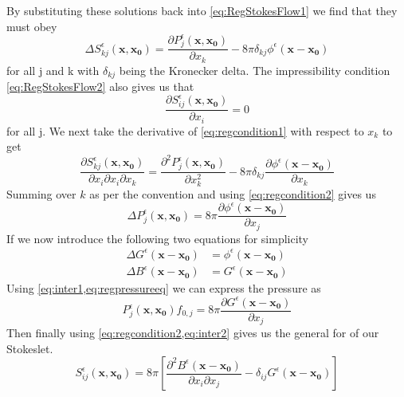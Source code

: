 By substituting these solutions back into \cref{eq:RegStokesFlow1} we find that they must obey
\begin{equation}
\label{eq:regcondition1}
    \Delta S^\epsilon_{kj}(\mathbf{x},\mathbf{x_0}) = \frac{\partial P^\epsilon_{j}(\mathbf{x},\mathbf{x_0})}{\partial x_k} - 8\pi\delta_{kj}\phi^\epsilon(\mathbf{x}-\mathbf{x_0})
\end{equation}
for all j and k with $\delta_{kj}$ being the Kronecker delta. The impressibility condition \cref{eq:RegStokesFlow2} also gives us that
\begin{equation}
\label{eq:regcondition2}
    \frac{\partial S^\epsilon_{ij}(\mathbf{x},\mathbf{x_0})}{\partial x_i} = 0
\end{equation}
for all j. We next take the derivative of \cref{eq:regcondition1} with respect to $x_k$ to get
\begin{equation*}
    \frac{\partial S^\epsilon_{kj}(\mathbf{x},\mathbf{x_0})}{\partial x_i \partial x_i \partial x_k} = \frac{\partial^2 P^\epsilon_{j}(\mathbf{x},\mathbf{x_0})}{\partial x_k^2} - 8\pi\delta_{kj}\frac{\partial \phi^\epsilon(\mathbf{x}-\mathbf{x_0})}{\partial x_k}
\end{equation*}
Summing over $k$ as per the convention and using \cref{eq:regcondition2} gives us
\begin{equation}
\label{eq:regpressureeq}
    \Delta P^\epsilon_{j}(\mathbf{x},\mathbf{x_0}) = 8\pi\frac{\partial \phi^\epsilon(\mathbf{x}-\mathbf{x_0})}{\partial x_j}
\end{equation}
If we now introduce the following two equations for simplicity
\begin{subequations}
\label{eq:intermediate}
\begin{align}
    \Delta G^\epsilon(\mathbf{x}-\mathbf{x_0})  &= \phi^\epsilon(\mathbf{x}-\mathbf{x_0}) \label{eq:inter1} \\
    \Delta B^\epsilon(\mathbf{x}-\mathbf{x_0})  &= G^\epsilon(\mathbf{x}-\mathbf{x_0}) \label{eq:inter2}
\end{align}
\end{subequations}
Using \cref{eq:inter1,eq:regpressureeq} we can express the pressure as
\begin{equation}
\label{eq:pressuresol}
    P^\epsilon_{j}(\mathbf{x},\mathbf{x_0})f_{0,j} = 8 \pi \frac{\partial G^\epsilon(\mathbf{x}-\mathbf{x_0})}{\partial x_j}
\end{equation}
Then finally using \cref{eq:regcondition2,eq:inter2} gives us the general for of our Stokeslet.
\begin{equation}
\label{eq:regstokeslet1}
    S_{ij}^\epsilon(\mathbf{x}, \mathbf{x_0}) = 8\pi\left[ \frac{\partial^2 B^\epsilon(\mathbf{x} -\mathbf{x_0})}{\partial x_i \partial x_j} - \delta_{ij}  G^\epsilon(\mathbf{x} -\mathbf{x_0})\right]
\end{equation}
